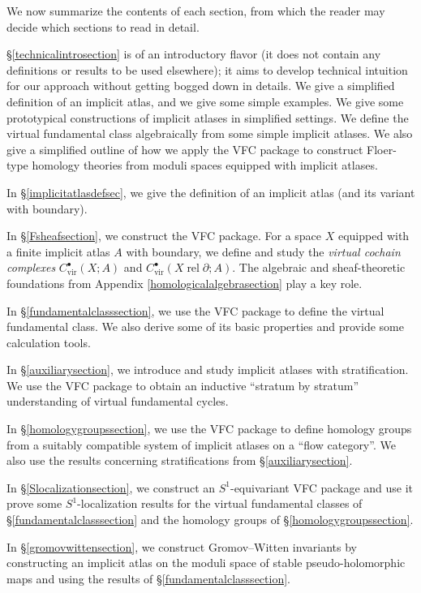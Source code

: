 \documentclass[12pt]{article}
\theoremstyle{definition}
\theoremstyle{remark}
\numberwithin{equation}{subsection}
\newcommand{\vir}{\mathrm{vir}}
\newcommand{\rel}{\operatorname{rel}}
\begin{document}
We now summarize the contents of each section, from which the reader may decide which sections to read in detail.

\S\ref{technicalintrosection} is of an introductory flavor (it does not contain any definitions or results to be used elsewhere); it aims to develop technical intuition for our approach without getting bogged down in details.  We give a simplified definition of an implicit atlas, and we give some simple examples.  We give some prototypical constructions of implicit atlases in simplified settings.  We define the virtual fundamental class algebraically from some simple implicit atlases.  We also give a simplified outline of how we apply the VFC package to construct Floer-type homology theories from moduli spaces equipped with implicit atlases.

In \S\ref{implicitatlasdefsec}, we give the definition of an implicit atlas (and its variant with boundary).

In \S\ref{Fsheafsection}, we construct the VFC package.  For a space $X$ equipped with a finite implicit atlas $A$ with boundary, we define and study the \emph{virtual cochain complexes} $C^\bullet_\vir(X;A)$ and $C^\bullet_\vir(X\rel\partial;A)$.  The algebraic and sheaf-theoretic foundations from Appendix \ref{homologicalalgebrasection} play a key role.

In \S\ref{fundamentalclasssection}, we use the VFC package to define the virtual fundamental class.  We also derive some of its basic properties and provide some calculation tools.

In \S\ref{auxiliarysection}, we introduce and study implicit atlases with stratification.  We use the VFC package to obtain an inductive ``stratum by stratum'' understanding of virtual fundamental cycles.

In \S\ref{homologygroupssection}, we use the VFC package to define homology groups from a suitably compatible system of implicit atlases on a ``flow category''.  We also use the results concerning stratifications from \S\ref{auxiliarysection}.

In \S\ref{Slocalizationsection}, we construct an $S^1$-equivariant VFC package and use it prove some $S^1$-localization results for the virtual fundamental classes of \S\ref{fundamentalclasssection} and the homology groups of \S\ref{homologygroupssection}.

In \S\ref{gromovwittensection}, we construct Gromov--Witten invariants by constructing an implicit atlas on the moduli space of stable pseudo-holomorphic maps and using the results of \S\ref{fundamentalclasssection}.
\end{document}
